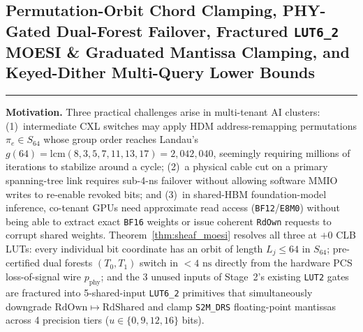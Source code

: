 \documentclass[10pt,twocolumn]{article}
\makeatletter
\newif\ifspecintwocol \specintwocolfalse
\newif\ifspecresume   \specresumefalse
\newcommand{\StopTwoCol}{%
  \if@twocolumn
    \onecolumn
    \global\specintwocolfalse
    \let\spec@next\@empty
  \else
    \ifspecintwocol
      \global\specintwocolfalse
      \def\spec@next{\end{multicols}}%
    \else
      \let\spec@next\@empty
    \fi
  \fi
  \spec@next
}
\newcommand{\BeginConnesPlate}{%
  \if@twocolumn
    \onecolumn
    \global\specresumetrue
    \let\spec@platepre\@empty
  \else
    \ifspecintwocol
      \global\specresumetrue
      \let\spec@platepre\StopTwoCol
    \else
      \global\specresumefalse
      \let\spec@platepre\@empty
    \fi
  \fi
  \spec@platepre
  \par\vspace{4pt}\noindent\textcolor{black!25}{\rule{\textwidth}{0.4pt}}\par\vspace{3pt}%
}
\theoremstyle{spectralthm}
\makeatother
\begin{document}
\subsection{Permutation-Orbit Chord Clamping, PHY-Gated Dual-Forest Failover, Fractured \texorpdfstring{\texttt{LUT6\_2}}{LUT6\_2} MOESI \& Graduated Mantissa Clamping, and Keyed-Dither Multi-Query Lower Bounds}
\label{sec:sheaf_moesi}

\BeginConnesPlate
\noindent\textbf{Motivation.}\; Three practical challenges arise in multi-tenant AI clusters: (1)~intermediate CXL switches may apply HDM address-remapping permutations $\pi_e \in S_{64}$ whose group order reaches Landau's $g(64) = \mathrm{lcm}(8,3,5,7,11,13,17) = 2,042,040$, seemingly requiring millions of iterations to stabilize around a cycle; (2)~a physical cable cut on a primary spanning-tree link requires sub-4-ns failover without allowing software MMIO writes to re-enable revoked bits; and (3)~in shared-HBM foundation-model inference, co-tenant GPUs need approximate read access (\texttt{BF12}/\texttt{E8M0}) without being able to extract exact \texttt{BF16} weights or issue coherent \texttt{RdOwn} requests to corrupt shared weights. Theorem~\ref{thm:sheaf_moesi} resolves all three at $+0$ CLB LUTs: every individual bit coordinate has an orbit of length $L_j \le 64$ in $S_{64}$; pre-certified dual forests $(T_0,T_1)$ switch in $<4\text{~ns}$ directly from the hardware PCS loss-of-signal wire $p_{\mathrm{phy}}$; and the 3 unused inputs of Stage~2's existing \texttt{LUT2} gates are fractured into 5-shared-input \mbox{\texttt{LUT6\_2}} primitives that simultaneously downgrade $\mathrm{RdOwn}\mapsto\mathrm{RdShared}$ and clamp \texttt{S2M\_DRS} floating-point mantissas across 4 precision tiers ($u \in \{0,9,12,16\}$ bits).
\end{document}
